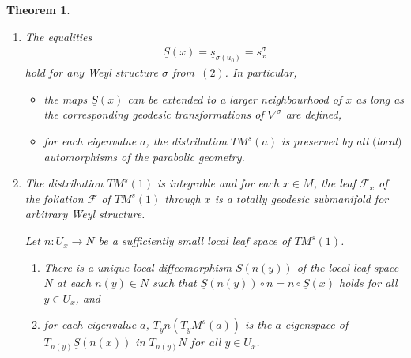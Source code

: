 \documentclass[pdftex]{sigma}
\newcommand{\si}{\sigma}
\newcommand{\un}{\underline}
\numberwithin{equation}{section}
\newtheorem{Theorem}{Theorem}[section]
\begin{document}
\begin{Theorem}
\begin{enumerate}
\item[$4.$] The equalities \begin{gather*}\un S(x)=\un s_{\si(u_0)}=s_x^\si\end{gather*} hold for any Weyl structure $\si$ from~$(2)$. In particular,
\begin{itemize}\itemsep=0pt
\item the maps $\un S(x)$ can be extended to a larger neighbourhood of $x$ as long as the corresponding geodesic transformations of $\nabla^\si$ are defined,
\item for each eigenvalue $a$, the distribution $TM^s(a)$ is preserved by all $($local$)$ automorphisms of the parabolic geometry.
\end{itemize}
\item[$5.$] The distribution $TM^s(1)$ is integrable and for each $x \in M$, the leaf $\mathcal{F}_x$ of the foliation $\mathcal{F}$ of $TM^s(1)$ through $x$ is a totally geodesic submanifold for arbitrary Weyl structure.

Let $n\colon U_x\to N$ be a sufficiently small local leaf space of $TM^s(1)$.
\begin{enumerate}\itemsep=0pt
\item[$(a)$] There is a unique local diffeomorphism $\un S(n(y))$ of the local leaf space $N$ at each $n(y)\in N$ such that $\un S(n(y))\circ n=n\circ \un S(x)$ holds for all $y\in U_x$, and
\item[$(b)$] for each eigenvalue $a$, $T_yn(T_yM^s(a))$ is the $a$-eigenspace of $T_{n(y)}\un S(n(x))$ in $T_{n(y)}N$ for all $y\in U_x$.
\end{enumerate}
\end{enumerate}
\end{Theorem}
\end{document}

